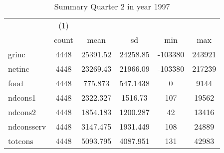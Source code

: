 \begin{table}[htbp]\centering
\def\sym#1{\ifmmode^{#1}\else\(^{#1}\)\fi}
\caption{Summary Quarter 2 in year 1997 \label{sum\_Q2\_y1997}}
\begin{tabular}{l*{1}{ccccc}}
\hline\hline
            &\multicolumn{1}{c}{(1)}&            &            &            &            \\
            &       count&        mean&          sd&         min&         max\\
\hline
grinc       &        4448&    25391.52&    24258.85&     -103380&      243921\\
netinc      &        4448&    23269.43&    21966.09&     -103380&      217239\\
food        &        4448&     775.873&    547.1438&           0&        9144\\
ndcons1     &        4448&    2322.327&     1516.73&         107&       19562\\
ndcons2     &        4448&    1854.183&    1200.287&          42&       13416\\
ndconsserv  &        4448&    3147.475&    1931.449&         108&       24889\\
totcons     &        4448&    5093.795&    4087.951&         131&       42983\\
\hline\hline
\end{tabular}
\end{table}
